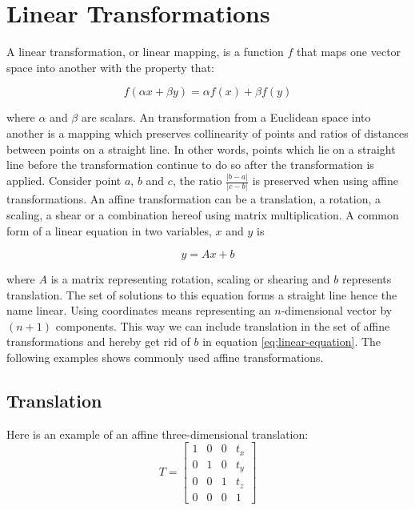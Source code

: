 
\section{Linear Transformations}
\label{sec:linear_transformation}
A linear transformation, or linear mapping, is a function $f$ that maps
one vector space into another with the property that:

\begin{equation}
f(\alpha x + \beta y) = \alpha f(x) + \beta f(y)
\end{equation}

where $\alpha$ and $\beta$ are scalars.
An  transformation from a Euclidean space into another is
a mapping which preserves collinearity of points and ratios of
distances between points on a straight line. In other words, points which lie
on a straight line before the transformation continue to do so after the transformation is
applied. Consider point $a$, $b$ and $c$, the ratio $\frac{ \vert
  b-a\vert}{\vert c-b \vert}$ is preserved when using affine transformations.
An affine transformation can be a translation, a rotation, a scaling,
a shear or a combination hereof using matrix
multiplication.
%
A common form of a linear equation in two variables, $x$ and $y$ is 

\begin{equation}
\label{eq:linear-equation}
y = A x + b
\end{equation}

where $A$ is a matrix representing rotation, scaling or shearing and
$b$ represents translation. 
The set of solutions to this equation forms a straight line hence the
name linear. Using  coordinates means representing an
$n$-dimensional vector by $(n+1)$ components. This way we can
include translation in the set of affine transformations and hereby get rid of
$b$ in equation \eqref{eq:linear-equation}. 
The following examples shows commonly used affine transformations. \\

\subsection*{Translation}
\label{sec:basic_math_translation}
Here is an example of an affine three-dimensional translation:
\begin{equation}
\label{eq:translation_matrix}
T = 
\begin{bmatrix} 
1 & 0 & 0 & t_x \\ 
0 & 1 & 0 & t_y \\ 
0 & 0 & 1 & t_z \\
0 & 0 & 0 & 1 
\end{bmatrix} 
\end{equation} 

